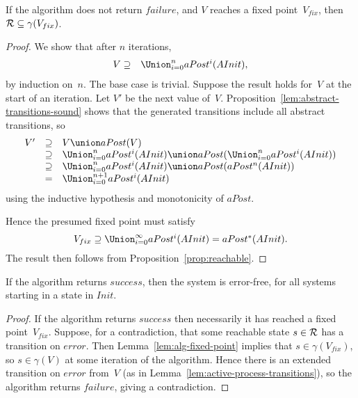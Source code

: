 \begin{lemma}
\label{lem:alg-fixed-point}
If the algorithm does not return $failure$, and $V$ reaches a fixed
point~$V_{fix}$, then $\mathcal{R} \subseteq \gamma( {V_{fix}} )$.
\end{lemma}
%
\begin{proof}
We show that after $n$ iterations,
\begin{eqnarray*}
{V} & \supseteq & \textstyle\Union_{i = 0}^n aPost^i({AInit}),
\end{eqnarray*}
%
by induction on~$n$.  The base case is trivial.  Suppose the result holds
for~$V$ at the start of an iteration.  Let $V'$ be the next value of~$V$.
Proposition~\ref{lem:abstract-transitions-sound} shows that the generated
transitions include all abstract transitions, so
\[
\begin{array}{rcl}
{V'} %
& \supseteq & {V} \union aPost({V}) \\
& \supseteq & \Union_{i = 0}^n aPost^i({AInit}) \union
      aPost(\Union_{i = 0}^n aPost^i({AInit})) \\
& \supseteq & \Union_{i = 0}^n aPost^i({AInit}) \union 
  aPost(aPost^n({AInit})) \\
& = & \Union_{i = 0}^{n+1} aPost^i({AInit})
\end{array}
\] 
using the inductive hypothesis and monotonicity of $aPost$. 

Hence the presumed fixed point must satisfy
\[
{V_{fix}} \supseteq  \textstyle\Union_{i = 0}^\infty aPost^i({AInit}) = 
  aPost^*({AInit}).
\]
The result then follows from Proposition~\ref{prop:reachable}.
\end{proof}


\begin{prop}
If the algorithm returns $success$, then the system is error-free, for all
systems starting in a state in $Init$.
\end{prop}
%
\begin{proof}
If the algorithm returns $success$ then necessarily it has reached a fixed
point~$V_{fix}$.  Suppose, for a contradiction, that some reachable state $s
\in \mathcal{R}$ has a transition on $error$.  Then Lemma~\ref{lem:alg-fixed-point}
implies that $s \in \gamma({V_{fix}})$, so $s \in \gamma({V})$ at some
iteration of the algorithm.  Hence there is an extended transition on $error$
from~${V}$ (as in Lemma~\ref{lem:active-process-transitions}), so the
algorithm returns $failure$, giving a contradiction.
\end{proof}

